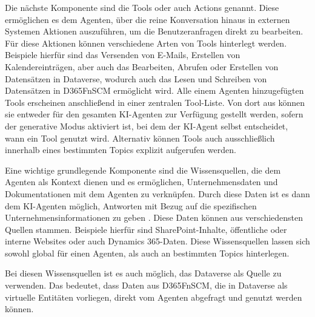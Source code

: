 Die nächste Komponente sind die Tools oder auch Actions genannt. Diese ermöglichen es dem Agenten, über die reine Konversation hinaus in externen Systemen Aktionen auszuführen, um die Benutzeranfragen direkt zu bearbeiten. Für diese Aktionen können verschiedene Arten von Tools hinterlegt werden. Beispiele hierfür sind das Versenden von E-Mails, Erstellen von Kalendereinträgen, aber auch das Bearbeiten, Abrufen oder Erstellen von Datensätzen in Dataverse, wodurch auch das Lesen und Schreiben von Datensätzen in \ac{D365FnSCM} ermöglicht wird. Alle einem Agenten hinzugefügten Tools erscheinen anschließend in einer zentralen Tool-Liste. Von dort aus können sie entweder für den gesamten \ac{KI}-Agenten zur Verfügung gestellt werden, sofern der generative Modus aktiviert ist, bei dem der \ac{KI}-Agent selbst entscheidet, wann ein Tool genutzt wird. Alternativ können Tools auch ausschließlich innerhalb eines bestimmten Topics explizit aufgerufen werden. \cite{garypretty_add_2025}

Eine wichtige grundlegende Komponente sind die Wissensquellen, die dem Agenten als Kontext dienen und es ermöglichen, Unternehmensdaten und Dokumentationen mit dem Agenten zu verknüpfen. \cite{mssqlgirl_knowledge_2025} Durch diese Daten ist es dann dem \ac{KI}-Agenten möglich, Antworten mit Bezug auf die spezifischen Unternehmensinformationen zu geben \cite{iaanw_overview_2025}. Diese Daten können aus verschiedensten Quellen stammen. Beispiele hierfür sind SharePoint-Inhalte, öffentliche oder interne Websites oder auch Dynamics 365-Daten. Diese Wissensquellen lassen sich sowohl global für einen Agenten, als auch an bestimmten Topics hinterlegen. \cite{mssqlgirl_knowledge_2025}

Bei diesen Wissensquellen ist es auch möglich, das Dataverse als Quelle zu verwenden. Das bedeutet, dass Daten aus \ac{D365FnSCM}, die in Dataverse als virtuelle Entitäten vorliegen, direkt vom Agenten abgefragt und genutzt werden können. \cite{relnotes_add_2025}

